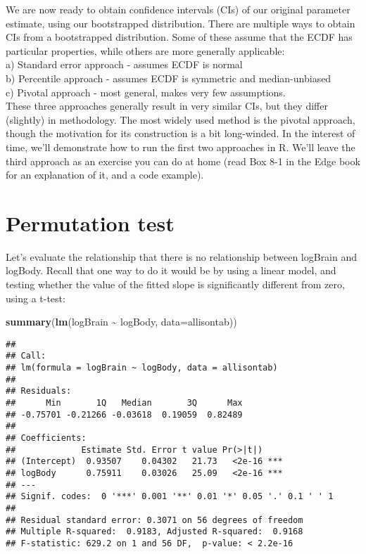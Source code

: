 \documentclass[
]{book}
\newenvironment{Shaded}{\begin{snugshade}}{\end{snugshade}}
\newcommand{\DataTypeTok}[1]{\textcolor[rgb]{0.13,0.29,0.53}{#1}}
\newcommand{\KeywordTok}[1]{\textcolor[rgb]{0.13,0.29,0.53}{\textbf{#1}}}
\newcommand{\NormalTok}[1]{#1}
\newcommand{\OperatorTok}[1]{\textcolor[rgb]{0.81,0.36,0.00}{\textbf{#1}}}
\newcommand{\StringTok}[1]{\textcolor[rgb]{0.31,0.60,0.02}{#1}}
\begin{document}
We are now ready to obtain confidence intervals (CIs) of our original parameter estimate, using our bootstrapped distribution. There are multiple ways to obtain CIs from a bootstrapped distribution. Some of these assume that the ECDF has particular properties, while others are more generally applicable:\\
a) Standard error approach - assumes ECDF is normal\\
b) Percentile approach - assumes ECDF is symmetric and median-unbiased\\
c) Pivotal approach - most general, makes very few assumptions.\\
These three approaches generally result in very similar CIs, but they differ (slightly) in methodology. The most widely used method is the pivotal approach, though the motivation for its construction is a bit long-winded. In the interest of time, we'll demonstrate how to run the first two approaches in R. We'll leave the third approach as an exercise you can do at home (read Box 8-1 in the Edge book for an explanation of it, and a code example).

\hypertarget{permutation-test}{%
\section{Permutation test}\label{permutation-test}}

Let's evaluate the relationship that there is no relationship between logBrain and logBody. Recall that one way to do it would be by using a linear model, and testing whether the value of the fitted slope is significantly different from zero, using a t-test:

\begin{Shaded}
\begin{Highlighting}[]
\KeywordTok{summary}\NormalTok{(}\KeywordTok{lm}\NormalTok{(logBrain }\OperatorTok{\textasciitilde{}}\StringTok{ }\NormalTok{logBody, }\DataTypeTok{data=}\NormalTok{allisontab))}
\end{Highlighting}
\end{Shaded}

\begin{verbatim}
## 
## Call:
## lm(formula = logBrain ~ logBody, data = allisontab)
## 
## Residuals:
##      Min       1Q   Median       3Q      Max 
## -0.75701 -0.21266 -0.03618  0.19059  0.82489 
## 
## Coefficients:
##             Estimate Std. Error t value Pr(>|t|)    
## (Intercept)  0.93507    0.04302   21.73   <2e-16 ***
## logBody      0.75911    0.03026   25.09   <2e-16 ***
## ---
## Signif. codes:  0 '***' 0.001 '**' 0.01 '*' 0.05 '.' 0.1 ' ' 1
## 
## Residual standard error: 0.3071 on 56 degrees of freedom
## Multiple R-squared:  0.9183, Adjusted R-squared:  0.9168 
## F-statistic: 629.2 on 1 and 56 DF,  p-value: < 2.2e-16
\end{verbatim}
\end{document}
